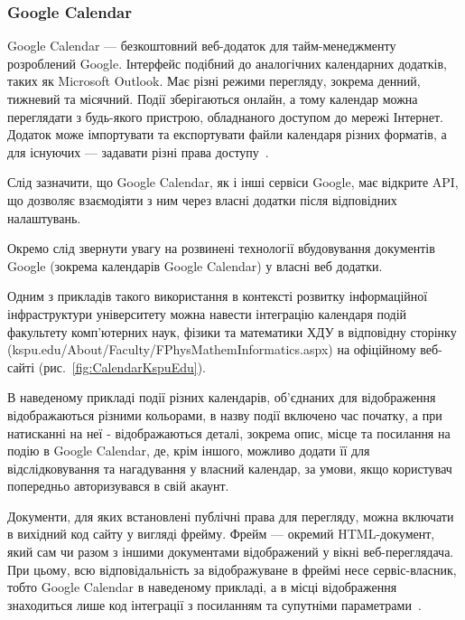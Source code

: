 \subsubsection{Google Calendar}

Google Calendar — безкоштовний веб-додаток для тайм-менеджменту розроблений Google. Інтерфейс подібний до аналогічних календарних додатків, таких як Microsoft Outlook. Має різні режими перегляду, зокрема денний, тижневий та місячний. Події зберігаються онлайн, а тому календар можна переглядати з будь-якого пристрою, обладнаного доступом до мережі Інтернет. Додаток може імпортувати та експортувати файли календаря різних форматів, а для існуючих — задавати різні права доступу~\cite{олексюк2013деякі}. 

Слід зазначити, що Google Calendar, як і інші сервіси Google, має відкрите API, що дозволяє взаємодіяти з ним через власні додатки після відповідних налаштувань.

Окремо слід звернути увагу на розвинені технології вбудовування документів Google (зокрема календарів Google Calendar) у власні веб додатки. 

Одним з прикладів такого використання в контексті розвитку інформаційної інфраструктури університету можна навести інтеграцію календаря подій факультету комп'ютерних наук, фізики та математики ХДУ в відповідну сторінку (kspu.edu/About/Faculty/FPhysMathemInformatics.aspx) на офіційному веб-сайті (рис.~\ref{fig:CalendarKspuEdu}).


В наведеному прикладі події різних календарів, об'єднаних для відображення відображаються різними кольорами, в назву події включено час початку, а при натисканні на неї - відображаються деталі, зокрема опис, місце та посилання на подію в Google Calendar, де, крім іншого, можливо додати її для відслідковування та нагадування у власний календар, за умови, якщо користувач попередньо авторизувався в свій акаунт.

Документи, для яких встановлені публічні права для перегляду, можна включати в вихідний код сайту у вигляді фрейму. Фрейм — окремий HTML-документ, який сам чи разом з іншими документами відображений у вікні веб-переглядача. При цьому, всю відповідальність за відображуване в фреймі несе сервіс-власник, тобто Google Calendar в наведеному прикладі, а в місці відображення знаходиться лише код інтеграції з посиланням та супутніми параметрами~\cite{ліщина2014проблеми}.

